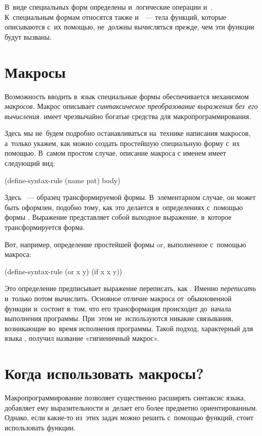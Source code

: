 В~виде специальных форм определены и~логические операции  и~. К~специальным формам относятся также  и~~--- тела функций, которые описываются с~их помощью, не~должны вычисляться прежде, чем эти функции будут вызваны.


\section[2]{Макросы}\label{macro}%
Возможность вводить в~язык \Scheme специальные формы обеспечивается механизмом \emph{макросов}. Макрос описывает \emph{синтаксическое преобразование выражения без~его вычисления}. \Scheme имеет чрезвычайно богатые средства для макропрограммирования.  

Здесь мы не~будем подробно останавливаться на~технике написания макросов, а~только укажем, как можно создать простейшую специальную форму с~их помощью. В~самом простом случае, описание макроса с именем  имеет следующий вид:

\begin{Specification}[emph={name,pat}]
(define-syntax-rule (name pat)
    body)
\end{Specification}

\noindent Здесь ~--- образец трансформируемой формы. В~элементарном случае, он может быть оформлен, подобно тому, как это делается в~определениях с~помощью формы . Выражение  представляет собой выходное выражение, в~которое трансформируется форма.

Вот, например, определение простейшей формы \si{or}, выполненное с~помощью макроса:

\begin{Definition}[emph={x,y}]
(define-syntax-rule (or x y)
  (if x x y))
\end{Definition}

Это определение предписывает выражение  переписать, как . Именно \emph{переписать} и~только потом вычислить. Основное отличие макроса от~обыкновенной функции и~состоит в~том, что его трансформация происходит до~начала выполнения программы. При~этом не~используются никакие связывания, возникающие во~время исполнения программы. Такой подход, характерный для языка , получил название «гигиеничный макрос».

\section{Когда использовать макросы?}%
Макропрограммирование позволяет существенно расширять синтаксис языка, добавляет ему выразительности и~делает его более предметно ориентированным. Однако, если какие-то из~этих задач можно решить с~помощью функций, стоит использовать функции.

